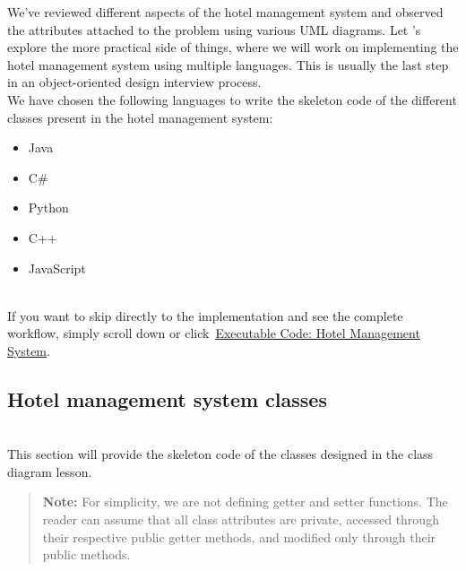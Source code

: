 

We've reviewed different aspects of the hotel management system and observed the attributes attached to the problem using various UML diagrams. Let 's explore the more practical side of things, where we will work on implementing the hotel management system using multiple languages. This is usually the last step in an object-oriented design interview process.
\\
We have chosen the following languages to write the skeleton code of the different classes present in the hotel management system:

\begin{itemize}
\item
\protect{}\label{lfBIAqHx_QnUUW7JZlcQ0}
Java
\item
\protect{}\label{RCVAXLIMq9kTw5dUhVHNq}
C\#
\item
\protect{}\label{mDHLq2rjFXGCss_2aCDT4}
Python
\item
\protect{}\label{eU8ikc6Rp3zwNvtToX4O7}
C++
\item
\protect{}\label{lSqYOUUS7-9j4Kt8CfXV_}
JavaScript
\end{itemize}
\\
If you want to skip directly to the implementation and see the complete workflow, simply scroll down or click~\hyperref[Executable-code-Hotel-management-system]{Executable Code: Hotel Management System}.

\subsection{Hotel management system classes}\label{guqoYLhLV_iZhJI9I5gTP}
\\
This section will provide the skeleton code of the classes designed in the class diagram lesson.
\begin{quote}
\textbf{Note:} For simplicity, we are not defining getter and setter functions. The reader can assume that all class attributes are private, accessed through their respective public getter methods, and modified only through their public methods.
\end{quote}
